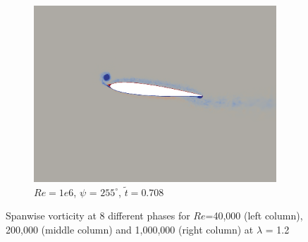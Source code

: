 \begin{figure}[H]
\begin{subfigure}[b]{0.32\textwidth}
		\includegraphics[width=1\textwidth]{figures/Vorticity_plots/Re_1m_1pt2/phase_255.png}
		\caption{$Re=1e6$, $\psi$ = $255^\circ$, $\tilde{t}=0.708$}
		\label{fig:Re_1m_1pt2_phi255}
	\end{subfigure}
	
	\caption{Spanwise vorticity at 8 different phases for $Re$=40,000 (left column), 200,000 (middle column) and 1,000,000 (right column) at $\lambda$ = 1.2}
\end{figure}


